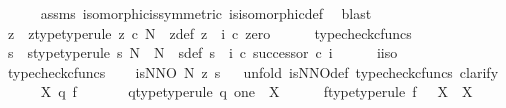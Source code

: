\begin{isabellebody}
\ \ \ \ \isamarkupfalse%
\ assms\ isomorphic{\isacharunderscore}{\kern0pt}is{\isacharunderscore}{\kern0pt}symmetric\ is{\isacharunderscore}{\kern0pt}isomorphic{\isacharunderscore}{\kern0pt}def\ \isamarkupfalse%
\ blast\ \isanewline
\ \ \isamarkupfalse%
\ z\ \ z{\isacharunderscore}{\kern0pt}type{\isacharbrackleft}{\kern0pt}type{\isacharunderscore}{\kern0pt}rule{\isacharbrackright}{\kern0pt}{\isacharcolon}{\kern0pt}\ {\isachardoublequoteopen}z\ {\isasymin}\isactrlsub c\ N{\isachardoublequoteclose}\ \ z{\isacharunderscore}{\kern0pt}def{\isacharcolon}{\kern0pt}\ {\isachardoublequoteopen}z\ {\isacharequal}{\kern0pt}\ i\ {\isasymcirc}\isactrlsub c\ zero{\isachardoublequoteclose}\isanewline
\ \ \ \ \isamarkupfalse%
\ typecheck{\isacharunderscore}{\kern0pt}cfuncs\isanewline
\ \ \isamarkupfalse%
\ s\ \ s{\isacharunderscore}{\kern0pt}type{\isacharbrackleft}{\kern0pt}type{\isacharunderscore}{\kern0pt}rule{\isacharbrackright}{\kern0pt}{\isacharcolon}{\kern0pt}\ {\isachardoublequoteopen}s{\isacharcolon}{\kern0pt}\ N\ {\isasymrightarrow}\ N{\isachardoublequoteclose}\ \ s{\isacharunderscore}{\kern0pt}def{\isacharcolon}{\kern0pt}\ {\isachardoublequoteopen}s\ {\isacharequal}{\kern0pt}\ {\isacharparenleft}{\kern0pt}i\ {\isasymcirc}\isactrlsub c\ successor{\isacharparenright}{\kern0pt}\ {\isasymcirc}\isactrlsub c\ i\isactrlbold {\isasyminverse}{\isachardoublequoteclose}\isanewline
\ \ \ \ \isamarkupfalse%
\ i{\isacharunderscore}{\kern0pt}iso\ \isamarkupfalse%
\ typecheck{\isacharunderscore}{\kern0pt}cfuncs\isanewline
\ \ \isamarkupfalse%
\ {\isachardoublequoteopen}is{\isacharunderscore}{\kern0pt}NNO\ N\ z\ s{\isachardoublequoteclose}\isanewline
\ \ \isamarkupfalse%
{\isacharparenleft}{\kern0pt}unfold\ is{\isacharunderscore}{\kern0pt}NNO{\isacharunderscore}{\kern0pt}def{\isacharcomma}{\kern0pt}\ typecheck{\isacharunderscore}{\kern0pt}cfuncs{\isacharcomma}{\kern0pt}\ clarify{\isacharparenright}{\kern0pt}\isanewline
\ \ \ \ \isamarkupfalse%
\ X\ q\ f\ \isanewline
\ \ \ \ \isamarkupfalse%
\ q{\isacharunderscore}{\kern0pt}type{\isacharbrackleft}{\kern0pt}type{\isacharunderscore}{\kern0pt}rule{\isacharbrackright}{\kern0pt}{\isacharcolon}{\kern0pt}\ {\isachardoublequoteopen}q{\isacharcolon}{\kern0pt}\ one\ {\isasymrightarrow}\ X{\isachardoublequoteclose}\isanewline
\ \ \ \ \isamarkupfalse%
\ f{\isacharunderscore}{\kern0pt}type{\isacharbrackleft}{\kern0pt}type{\isacharunderscore}{\kern0pt}rule{\isacharbrackright}{\kern0pt}{\isacharcolon}{\kern0pt}\ {\isachardoublequoteopen}f{\isacharcolon}{\kern0pt}\ \ \ X\ {\isasymrightarrow}\ X{\isachardoublequoteclose}\isanewline

\end{isabellebody}
